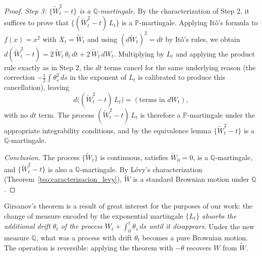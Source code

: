 \documentclass[11pt,a4paper,oneside]{report}
\theoremstyle{plain}
\theoremstyle{definition}
\theoremstyle{remark}
\newcommand{\PP}{\mathbb{P}}
\newcommand{\Q}{\mathbb{Q}}
\newcommand{\1}{\mathbf{1}}
\begin{document}
\begin{proof}
\emph{Step 3: $\{\widetilde{W}_t^2 - t\}$ is a $\Q$-martingale.} By
the characterization of Step 2, it suffices to prove that
$\{(\widetilde{W}_t^2 - t)\, L_t\}$ is a $\PP$-martingale. Applying
Itô's formula to $f(x) = x^2$ with $X_t = \widetilde{W}_t$ and using
$(d\widetilde{W}_t)^2 = dt$ by Itô's rules, we obtain
$d(\widetilde{W}_t^2 - t) = 2\, \widetilde{W}_t\, \theta_t\, dt + 2\, \widetilde{W}_t\, dW_t$.
Multiplying by $L_t$ and applying the product rule exactly as in
Step 2, the $dt$ terms cancel for the same underlying reason (the
correction $-\tfrac{1}{2} \int \theta_s^2\, ds$ in the exponent of
$L_t$ is calibrated to produce this cancellation), leaving
\begin{equation*}
  d\bigl((\widetilde{W}_t^2 - t)\, L_t\bigr)
  = (\text{terms in } dW_t),
\end{equation*}
with no $dt$ term. The process $(\widetilde{W}_t^2 - t)\, L_t$ is
therefore a $\PP$-martingale under the appropriate integrability
conditions, and by the equivalence lemma $\{\widetilde{W}_t^2 - t\}$
is a $\Q$-martingale.

\emph{Conclusion.} The process $\{\widetilde{W}_t\}$ is continuous,
satisfies $\widetilde{W}_0 = 0$, is a $\Q$-martingale, and
$\{\widetilde{W}_t^2 - t\}$ is also a $\Q$-martingale. By Lévy's
characterization (Theorem~\ref{teo:caracterizacion_levy}),
$\widetilde{W}$ is a standard Brownian motion under $\Q$.
\end{proof}

Girsanov's theorem is a
result of great interest for the purposes of our work: the change of
measure encoded by the exponential martingale $\{L_t\}$
\emph{absorbs the additional drift $\theta_t$ of the process
$W_t + \int_0^t \theta_s\, ds$ until it disappears}. Under the new
measure $\Q$, what was a process with drift $\theta_t$ becomes a pure
Brownian motion. The operation is reversible: applying the theorem
with $-\theta$ recovers $W$ from $\widetilde{W}$.
\end{document}
